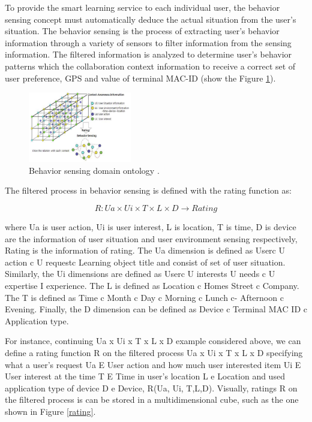 \documentclass[journal]{vgtc}                %
\begin{document}
  To provide the smart learning service to each individual user, the behavior sensing concept must automatically deduce the actual situation from the user's situation. The behavior sensing is the process of extracting user's behavior information through a variety of sensors to filter information from the sensing information. The filtered information is analyzed to determine user's behavior patterns which the collaboration context information to receive a correct set of user preference, GPS and value of terminal MAC-ID (show the Figure \ref{behaviour-sensing}).

  \begin{figure}[htb]
    \centering
    \includegraphics[width=0.4\textwidth]{behaviour-sensing}
    \caption{Behavior sensing domain ontology \cite{Kim2013}.}
    \label{behaviour-sensing}
  \end{figure}

  The filtered process in behavior sensing is defined with the rating function as:

  \begin{equation}
    R: Ua \times Ui \times T \times L \times D \rightarrow Rating
  \end{equation}

  where Ua is user action, Ui is user interest, L is location, T is time, D is device are the information of user situation  and user environment sensing respectively, Rating is the  information of rating. The Ua dimension is defined as Userc U action c U requestc Learning object title and consist of set of user situation. Similarly, the Ui dimensions are defined as Userc U interests U needs c U expertise I experience. The L is defined as Location c Homes Street c Company. The T is defined as Time c Month c Day c Morning c Lunch c- Afternoon c Evening. Finally, the D dimension can be defined as Device c Terminal MAC ID c Application type.

  For instance, continuing Ua x Ui x T x L x D example considered above, we can define a rating function R on the filtered process Ua x Ui x T x L x D specifying what a user's request Ua E User action and how much user interested item Ui E User interest at the time T E Time in user's location L e Location and used application type of device D e Device, R(Ua, Ui, T,L,D). Visually, ratings R on the filtered process is can be stored in a multidimensional cube, such as the one shown in Figure \ref{rating}.
\end{document}
